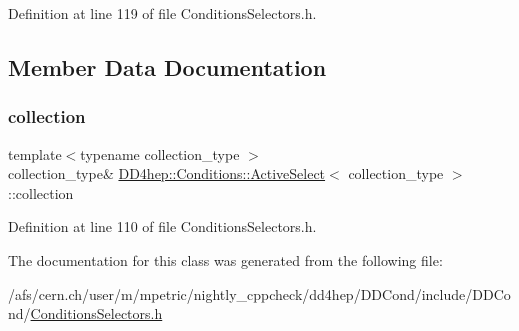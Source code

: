 Definition at line 119 of file Conditions\+Selectors.\+h.



\subsection{Member Data Documentation}
\hypertarget{class_d_d4hep_1_1_conditions_1_1_active_select_a413343e5a2aaf171132771e5ad3e0f5d}{}\label{class_d_d4hep_1_1_conditions_1_1_active_select_a413343e5a2aaf171132771e5ad3e0f5d} 
\subsubsection{\texorpdfstring{collection}{collection}}
{\footnotesize\ttfamily template$<$typename collection\+\_\+type $>$ \\
collection\+\_\+type\& \hyperlink{class_d_d4hep_1_1_conditions_1_1_active_select}{D\+D4hep\+::\+Conditions\+::\+Active\+Select}$<$ collection\+\_\+type $>$\+::collection\hspace{0.3cm}{\ttfamily [private]}}



Definition at line 110 of file Conditions\+Selectors.\+h.



The documentation for this class was generated from the following file\+:\begin{DoxyCompactItemize}
\item 
/afs/cern.\+ch/user/m/mpetric/nightly\+\_\+cppcheck/dd4hep/\+D\+D\+Cond/include/\+D\+D\+Cond/\hyperlink{_conditions_selectors_8h}{Conditions\+Selectors.\+h}\end{DoxyCompactItemize}
